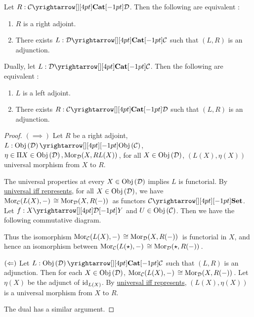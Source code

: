 \begin{prop}
  \hypertarget{uniprop_char_adj}{}

  Let $R : \map{\CC}{\DD}{\CAT}{}$.
  Then the following are equivalent : 
  \begin{enumerate}
    \item $R$ is a right adjoint. 
    \item There exists $L : \map{\DD}{\CC}{\CAT}{}$ such that 
    $(L,R)$ is an adjunction. 
  \end{enumerate}

  Dually, let $L : \map{\DD}{\CC}{\CAT}{}$.
  Then the following are equivalent : 
  \begin{enumerate}
    \item $L$ is a left adjoint. 
    \item There exists $R : \map{\CC}{\DD}{\CAT}{}$ such that 
    $(L,R)$ is an adjunction. 
  \end{enumerate}
\end{prop}
\begin{proof}
  $(\implies)$
  Let $R$ be a right adjoint, $L : \map{\obj{\DD}}{\obj{\CC}}{}{}$, 
  $\eta \in \Pi X \in \mathrm{Obj}\left(\mathcal{D}\right), \mathrm{Mor}_{\mathcal{D}}(X, RL(X))\,$,
  for all $X \in \mathrm{Obj}\left(\mathcal{D}\right)$, $(L(X),\eta(X))$ universal morphism from 
  $X$ to $R$.

  The universal properties at every $X \in \mathrm{Obj}\left(\mathcal{D}\right)$ implies 
  $L$ is functorial.
  By \hyperlink{uni_iff_rep}{universal iff represents},
  for all $X \in \mathrm{Obj}\left(\mathcal{D}\right)$, 
  we have $\mathrm{Mor}_{\mathcal{C}}(L(X), -)\, \cong \mathrm{Mor}_{\mathcal{D}}(X, R(-))\,$
  as functors $\map{\CC}{\SET}{}{}$.
  Let $f : \map{X}{Y}{\DD}{}$ and $U \in \mathrm{Obj}\left(\mathcal{C}\right)$.
  Then we have the following commutative diagram. 
  \begin{figure}[H]
    \centering
  \end{figure}
  Thus the isomorphism $\mathrm{Mor}_{\mathcal{C}}(L(X), -)\, \cong \mathrm{Mor}_{\mathcal{D}}(X, R(-))\,$
  is functorial in $X$, 
  and hence an isomorphism between
  $\mathrm{Mor}_{\mathcal{C}}(L(\star), -)\, \cong \mathrm{Mor}_{\mathcal{D}}(\star, R(-))\,$.

  $(\Leftarrow)$ 
  Let $L : \map{\obj{\DD}}{\CC}{\CAT}{}$ such that 
  $(L,R)$ is an adjunction. 
  Then for each $X \in \mathrm{Obj}\left(\mathcal{D}\right)$, 
  $\mathrm{Mor}_{\mathcal{C}}(L(X), -)\, \cong \mathrm{Mor}_{\mathcal{D}}(X, R(-))\,$.
  Let $\eta(X)$ be the adjunct of $\mathrm{id}_{L(X)}$.
  By \hyperlink{uni_iff_rep}{universal iff represents},
  $(L(X),\eta(X))$ is a universal morphism from $X$ to $R$.

  The dual has a similar argument. 
\end{proof}

